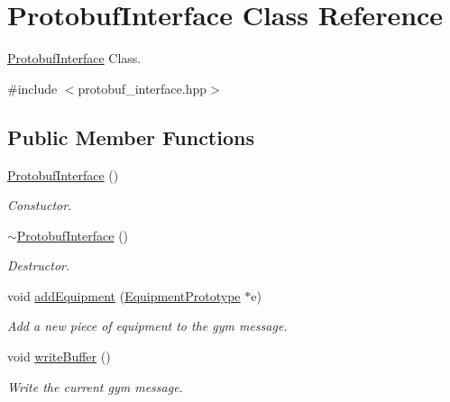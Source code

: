 \hypertarget{class_protobuf_interface}{}\section{Protobuf\+Interface Class Reference}
\label{class_protobuf_interface}


\hyperlink{class_protobuf_interface}{Protobuf\+Interface} Class.  




{\ttfamily \#include $<$protobuf\+\_\+interface.\+hpp$>$}

\subsection*{Public Member Functions}
\begin{DoxyCompactItemize}
\item 
\hypertarget{class_protobuf_interface_a4d65823e8eb886b99dd5eb7e7de0b654}{}\hyperlink{class_protobuf_interface_a4d65823e8eb886b99dd5eb7e7de0b654}{Protobuf\+Interface} ()\label{class_protobuf_interface_a4d65823e8eb886b99dd5eb7e7de0b654}

\begin{DoxyCompactList}\small\item\em Constuctor. \end{DoxyCompactList}\item 
\hypertarget{class_protobuf_interface_a678642544e3b285b8967bb4c9ff9dc03}{}\hyperlink{class_protobuf_interface_a678642544e3b285b8967bb4c9ff9dc03}{$\sim$\+Protobuf\+Interface} ()\label{class_protobuf_interface_a678642544e3b285b8967bb4c9ff9dc03}

\begin{DoxyCompactList}\small\item\em Destructor. \end{DoxyCompactList}\item 
\hypertarget{class_protobuf_interface_a4fcc7746952ac2d5631e99de56e40e79}{}void \hyperlink{class_protobuf_interface_a4fcc7746952ac2d5631e99de56e40e79}{add\+Equipment} (\hyperlink{class_equipment_prototype}{Equipment\+Prototype} $\ast$e)\label{class_protobuf_interface_a4fcc7746952ac2d5631e99de56e40e79}

\begin{DoxyCompactList}\small\item\em Add a new piece of equipment to the gym message. \end{DoxyCompactList}\item 
\hypertarget{class_protobuf_interface_ab98af826400aa8918a71849e0447834e}{}void \hyperlink{class_protobuf_interface_ab98af826400aa8918a71849e0447834e}{write\+Buffer} ()\label{class_protobuf_interface_ab98af826400aa8918a71849e0447834e}

\begin{DoxyCompactList}\small\item\em Write the current gym message. \end{DoxyCompactList}\end{DoxyCompactItemize}



